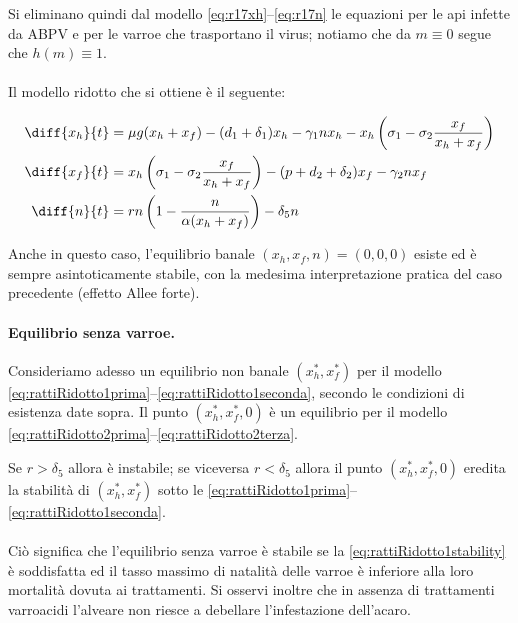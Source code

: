 Si eliminano quindi dal modello \eqref{eq:r17xh}--\eqref{eq:r17n} le equazioni per le api infette da ABPV e per le varroe che trasportano il virus; notiamo che da $m \equiv 0$ segue che $h(m) \equiv 1$.

\paragraph{}
Il modello ridotto che si ottiene è il seguente:

\begin{align}
    \diff{x_h}{t} &= \mu g( x_h + x_f ) - (d_1 + \delta_1) x_h - \gamma_1 n x_h
        - x_h \left( \sigma_1 - \sigma_2 \frac{x_f}{x_h + x_f} \right)
        \label{eq:rattiRidotto2prima}
    \\
    \diff{x_f}{t} &= x_h \left( \sigma_1 - \sigma_2 \frac{x_f}{x_h + x_f} \right) - (p + d_2 + \delta_2) x_f
        - \gamma_2 n x_f
        \label{eq:rattiRidotto2seconda}
    \\
    \diff{n}{t} &= rn \left( 1 - \frac{n}{ \alpha (x_h + x_f) } \right) - \delta_5 n
        \label{eq:rattiRidotto2terza}
\end{align}

Anche in questo caso, l'equilibrio banale $(x_h, x_f, n)=(0,0,0)$ esiste ed è sempre asintoticamente stabile, con la medesima interpretazione pratica del caso precedente (effetto Allee forte).

\paragraph{Equilibrio senza varroe. } Consideriamo adesso un equilibrio non banale $(x_h^*, x_f^*)$ per il modello \eqref{eq:rattiRidotto1prima}--\eqref{eq:rattiRidotto1seconda}, secondo le condizioni di esistenza date sopra.
Il punto $(x_h^*, x_f^*, 0)$ è un equilibrio per il modello \eqref{eq:rattiRidotto2prima}--\eqref{eq:rattiRidotto2terza}.

Se $r > \delta_5$ allora è instabile; se viceversa $r< \delta_5$ allora il punto $(x_h^*, x_f^*, 0)$ eredita la stabilità di $(x_h^*, x_f^*)$ sotto le \eqref{eq:rattiRidotto1prima}--\eqref{eq:rattiRidotto1seconda}.

\paragraph{}
Ciò significa che l'equilibrio senza varroe è stabile se la \eqref{eq:rattiRidotto1stability} è soddisfatta
ed il tasso massimo di natalità delle varroe è inferiore alla loro mortalità dovuta ai trattamenti.
Si osservi inoltre che in assenza di trattamenti varroacidi l'alveare non riesce a debellare l'infestazione dell'acaro.

